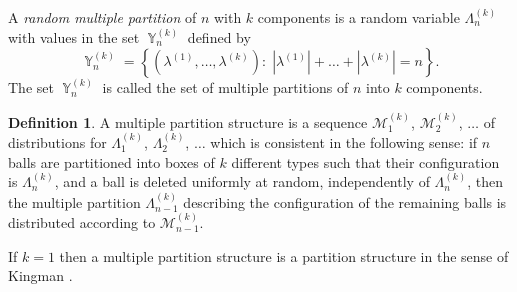 \documentclass[12pt]{amsart}
\theoremstyle{definition}
\newtheorem{defn}[thm]{Definition}
\numberwithin{equation}{section}
\DeclareMathOperator{\Y}{\mathbb{Y}}
\begin{document}
A \textit{random multiple partition} of $n$ with $k$ components is a   random variable
$\Lambda_n^{(k)}$ with values in the set $\Y_n^{(k)}$ defined by
\begin{equation}\label{SetYn}
\Y_n^{(k)}=\left\{\left(\lambda^{(1)},\ldots,\lambda^{(k)}\right):\;
|\lambda^{(1)}|+\ldots+|\lambda^{(k)}|=n\right\}.
\end{equation}
The set $\Y_n^{(k)}$ is called the set of multiple partitions of $n$
into $k$ components.
\begin{defn}\label{DEFINITIONMULTIPLEPARTITIONSTRUCTURE}
A multiple partition structure is a sequence $\mathcal{M}_1^{(k)}$, $\mathcal{M}_2^{(k)}$, $\ldots$ of distributions for $\Lambda_1^{(k)}$, $\Lambda_2^{(k)}$, $\ldots$ which is consistent in the following sense: if $n$ balls are partitioned into boxes of $k$ different types such that their configuration is $\Lambda_n^{(k)}$, and a ball is deleted uniformly at random, independently of $\Lambda_n^{(k)}$, then the multiple partition $\Lambda_{n-1}^{(k)}$ describing the configuration of the remaining balls is distributed according to $\mathcal{M}^{(k)}_{n-1}$.
\end{defn}


If $k=1$ then a multiple partition structure is a partition structure in the sense of Kingman \cite{Kingman1}.
\end{document}
